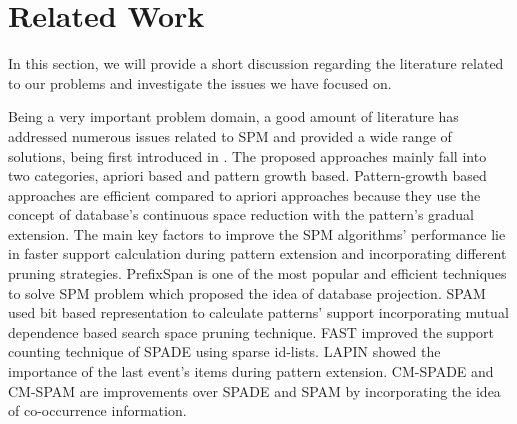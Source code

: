 \section{Related Work} \label{related_works}
In this section, we will provide a short discussion regarding the literature related to our problems and investigate the issues we have focused on.

Being a very important problem domain, a good amount of literature has addressed numerous issues related to SPM \cite{fournier2017survey,gan2019survey} and provided a wide range of solutions, being first introduced in \cite{srikant1996mining}. The proposed approaches mainly fall into two categories, apriori based and pattern growth based. Pattern-growth based approaches are efficient compared to apriori approaches because they use the concept of database's continuous space reduction with the pattern's gradual extension. The main key factors to improve the SPM algorithms' performance lie in faster support calculation during pattern extension and incorporating different pruning strategies\cite{fournier2014fast,han2001prefixspan,zaki2001spade,rizvee2020tree}. PrefixSpan \cite{han2001prefixspan} is one of the most popular and efficient techniques to solve SPM problem which proposed the idea of database projection. SPAM\cite{Spam} used bit based representation to calculate patterns' support incorporating mutual dependence based search space pruning technique. FAST\cite{Fast} improved the support counting technique of SPADE\cite{zaki2001spade} using sparse id-lists. LAPIN\cite{Lapin} showed the importance of the last event's items during pattern extension. CM-SPADE and CM-SPAM\cite{fournier2014fast} are improvements over SPADE and SPAM by incorporating the idea of co-occurrence information. 

